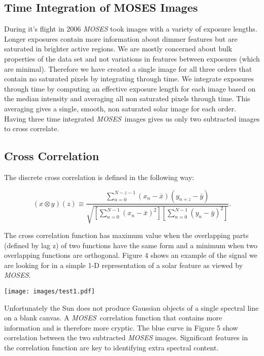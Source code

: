 \documentclass[]{aastex6}
\newcommand{\MOSES}{\textit{MOSES}}
\begin{document}
\subsection{Time Integration of MOSES Images}
	During it's flight in 2006 \textit{MOSES} took images with a variety of exposure lengths.  Longer exposures contain more information about dimmer features but are saturated in brighter active regions.  We are mostly concerned about bulk properties of the data set and not variations in features between exposures (which are minimal).  Therefore we have created a single image for all three orders that contain no saturated pixels by integrating through time.  We integrate exposures through time by computing an effective exposure length for each image based on the median intensity and averaging all non saturated pixels through time. This averaging gives a single, smooth, non saturated solar image for each order. Having three time integrated \MOSES \ images gives us only two subtracted images to cross correlate. 

\subsection{Cross Correlation}
The discrete cross correlation is defined in the following way:

\begin{equation}
(x \otimes y) (z) \equiv \dfrac{ \sum_{n=0}^{N-z-1} (x_n-\bar{x})(y_{n+z}-\bar{y})   }{\sqrt{[\sum_{n=0}^{N-1} (x_n-\bar{x})^2][\sum_{n=0}^{N-1} (y_{n}-\bar{y})^2 ]}}.
\end{equation}

The cross correlation function has maximum value when the overlapping parts (defined by lag z) of two functions have the same form and a minimum when two overlapping functions are orthogonal. Figure 4 shows an example of the signal we are looking for in a simple 1-D representation of a solar feature as viewed by \MOSES.  

\begin{figure*}[t]
\centering
\texttt{[image: images/test1.pdf]}
\caption{The top panel shows how an object not of He II would appear in a MOSES image. The object would appear in different locations in the Plus and Minus orders due to the diffraction grating.  The center panel shows subtracted images.  The Bottom panel shows the cross correlation of the subtracted image.}
\end{figure*}	

Unfortunately the Sun does not produce Gaussian objects of a single spectral line on a blank canvas. A \MOSES \ correlation function that contains more information and is therefore more cryptic. The blue curve in Figure 5 show correlation between the two subtracted \textit{MOSES} images. Significant features in the correlation function are key to identifying extra spectral content.
\end{document}
